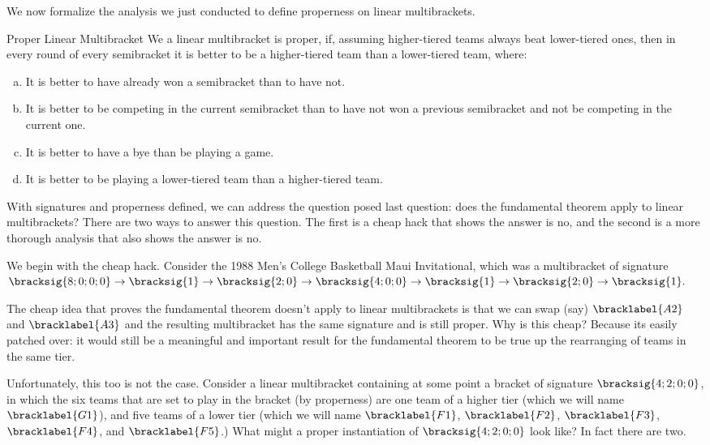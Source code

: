 {We now formalize the analysis we just conducted to define properness on linear multibrackets.

\begin{definition}{Proper Linear Multibracket}{}
    We a linear multibracket is proper, if, assuming higher-tiered teams always beat lower-tiered ones, then in every round of every semibracket it is better to be a higher-tiered team than a lower-tiered team, where:
    \begin{enumerate}[(a)]
        \item It is better to have already won a semibracket than to have not.
        \item It is better to be competing in the current semibracket than to have not won a previous semibracket and not be competing in the current one.
        \item It is better to have a bye than be playing a game.
        \item It is better to be playing a lower-tiered team than a higher-tiered team.
    \end{enumerate}
\end{definition}

With signatures and properness defined, we can address the question posed last question: does the fundamental theorem apply to linear multibrackets? There are two ways to answer this question. The first is a cheap hack that shows the answer is no, and the second is a more thorough analysis that also shows the answer is no.

We begin with the cheap hack. Consider the 1988 Men's College Basketball Maui Invitational, which was a multibracket of signature $\bracksig{8;0;0;0} \to \bracksig{1} \to \bracksig{2;0} \to \bracksig{4;0;0} \to \bracksig{1} \to \bracksig{2;0} \to \bracksig{1}.$


The cheap idea that proves the fundamental theorem doesn't apply to linear multibrackets is that we can swap (say) $\bracklabel{A2}$ and $\bracklabel{A3}$ and the resulting multibracket has the same signature and is still proper. Why is this cheap? Because its easily patched over: it would still be a meaningful and important result for the fundamental theorem to be true up the rearranging of teams in the same tier.

Unfortunately, this too is not the case. Consider a linear multibracket containing at some point a bracket of signature $\bracksig{4;2;0;0}$, in which the six teams that are set to play in the bracket (by properness) are one team of a higher tier (which we will name $\bracklabel{G1}$), and five teams of a lower tier (which we will name $\bracklabel{F1}$, $\bracklabel{F2}$, $\bracklabel{F3}$, $\bracklabel{F4}$, and $\bracklabel{F5}$.) What might a proper instantiation of $\bracksig{4;2;0;0}$ look like? In fact there are two.

}
